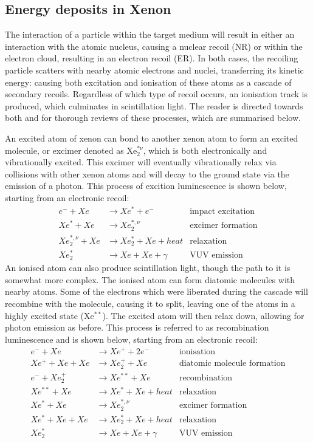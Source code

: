 \subsection{Energy deposits in Xenon}
\par
The interaction of a particle within the target medium will result in either an interaction with the atomic nucleus, causing a nuclear recoil (NR) or within the electron cloud, resulting in an electron recoil (ER).
In both cases, the recoiling particle scatters with nearby atomic electrons and nuclei, transferring its kinetic energy: causing both excitation and ionisation of these atoms as a cascade of secondary recoils.
Regardless of which type of recoil occurs, an ionisation track is produced, which culminates in scintillation light.
The reader is directed towards both \cite{xenon_physics_ref} and \cite{carldahl_thesis_ref} for thorough reviews of these processes, which are summarised below.
\par
An excited atom of xenon can bond to another xenon atom to form an excited molecule, or excimer denoted as Xe$_2^{*\nu}$, which is both electronically and vibrationally excited.
This excimer will eventually vibrationally relax via collisions with other xenon atoms and will decay to the ground state via the emission of a photon.
This process of excition luminescence is shown below, starting from an electronic recoil:
\begin{align*}
    e^- + Xe &\rightarrow Xe^* + e^-  &\text{impact excitation} \\ 
    Xe^* + Xe &\rightarrow Xe_2^{*,\nu} &\text{excimer formation} \\
    Xe_2^{*,\nu} + Xe &\rightarrow Xe_2^* + Xe + heat &\text{relaxation} \\
    Xe_2^* &\rightarrow Xe + Xe + \gamma &\text{VUV emission} 
\end{align*}
An ionised atom can also produce scintillation light, though the path to it is somewhat more complex.
The ionised atom can form diatomic molecules with nearby atoms.
Some of the electrons which were liberated during the cascade will recombine with the molecule, causing it to split, leaving one of the atoms in a highly excited state (Xe$^{**}$).
The excited atom will then relax down, allowing for photon emission as before.
This process is referred to as recombination luminescence and is shown below, starting from an electronic recoil:
\begin{align*}
    e^- + Xe &\rightarrow Xe^+ + 2e^- &\text{ionisation} \\ 
    Xe^+ + Xe + Xe &\rightarrow Xe_2^{+} + Xe &\text{diatomic molecule formation} \\
    e^- + Xe_2^+ &\rightarrow Xe^{**} + Xe &\text{recombination} \\
    Xe^{**} + Xe &\rightarrow Xe^{*} + Xe + heat &\text{relaxation} \\
    Xe^{*} + Xe  &\rightarrow Xe_2^{*,\nu} &\text{excimer formation} \\
    Xe^{*} + Xe + Xe &\rightarrow Xe_2^{*} + Xe + heat &\text{relaxation} \\
    Xe_2^* &\rightarrow Xe + Xe + \gamma &\text{VUV emission} 
\end{align*}
